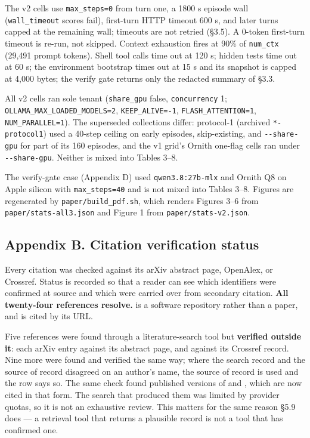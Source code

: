 \documentclass[
  10pt,
  a4paper,
]{article}
\let\oldtexttt\texttt
\renewcommand{\texttt}[1]{{\small\oldtexttt{#1}}}
\begin{document}
The v2 cells use \texttt{max\_steps=0} from turn one, a 1800 s episode
wall (\texttt{wall\_timeout} scores fail), first-turn HTTP timeout 600
s, and later turns capped at the remaining wall; timeouts are not
retried (§3.5). A 0-token first-turn timeout is re-run, not skipped.
Context exhaustion fires at 90\% of \texttt{num\_ctx} (29,491 prompt
tokens). Shell tool calls time out at 120 s; hidden tests time out at 60
s; the environment bootstrap times out at 15 s and its snapshot is
capped at 4,000 bytes; the verify gate returns only the redacted summary
of §3.3.

All v2 cells ran sole tenant (\texttt{share\_gpu} false,
\texttt{concurrency} 1; \texttt{OLLAMA\_MAX\_LOADED\_MODELS=2},
\texttt{KEEP\_ALIVE=-1}, \texttt{FLASH\_ATTENTION=1},
\texttt{NUM\_PARALLEL=1}). The superseded collections differ: protocol-1
(archived \texttt{*-protocol1}) used a 40-step ceiling on early
episodes, skip-existing, and \texttt{-\/-share-gpu} for part of its 160
episodes, and the v1 grid's Ornith one-flag cells ran under
\texttt{-\/-share-gpu}. Neither is mixed into Tables 3--8.

The verify-gate case (Appendix D) used \texttt{qwen3.8:27b-mlx} and
Ornith Q8 on Apple silicon with \texttt{max\_steps=40} and is not mixed
into Tables 3--8. Figures are regenerated by
\texttt{paper/build\_pdf.sh}, which renders Figures 3--6 from
\texttt{paper/stats-all3.json} and Figure 1 from
\texttt{paper/stats-v2.json}.

\subsection{Appendix B. Citation verification
status}\label{appendix-b.-citation-verification-status}

Every citation was checked against its arXiv abstract page, OpenAlex, or
Crossref. Status is recorded so that a reader can see which identifiers
were confirmed at source and which were carried over from secondary
citation. \textbf{All twenty-four references resolve.}
\citet{krafton2026kira} is a software repository rather than a paper,
and is cited by its URL.

Five references
\citep{zhou2026externalization, lou2026autoharness, zhang2026selfharness, shen2024smallllms, ernst2023registered}
were found through a literature-search tool but \textbf{verified outside
it}: each arXiv entry against its abstract page, and
\citet{ernst2023registered} against its Crossref record. Nine more
\citep{lin2026ahe, zhang2026darwinx, zhang2025dgm, bandel2026general, denison2024subterfuge, mckeereid2024honesty, miller2024errorbars, menkveld2024nonstandard, moghadasi2026disclose}
were found and verified the same way; where the search record and the
source of record disagreed on an author's name, the source of record is
used and the row says so. The same check found published versions of
\citet{liu2024survey} and \citet{shen2024smallllms}, which are now cited
in that form. The search that produced them was limited by provider
quotas, so it is not an exhaustive review. This matters for the same
reason §5.9 does --- a retrieval tool that returns a plausible record is
not a tool that has confirmed one.
\end{document}

